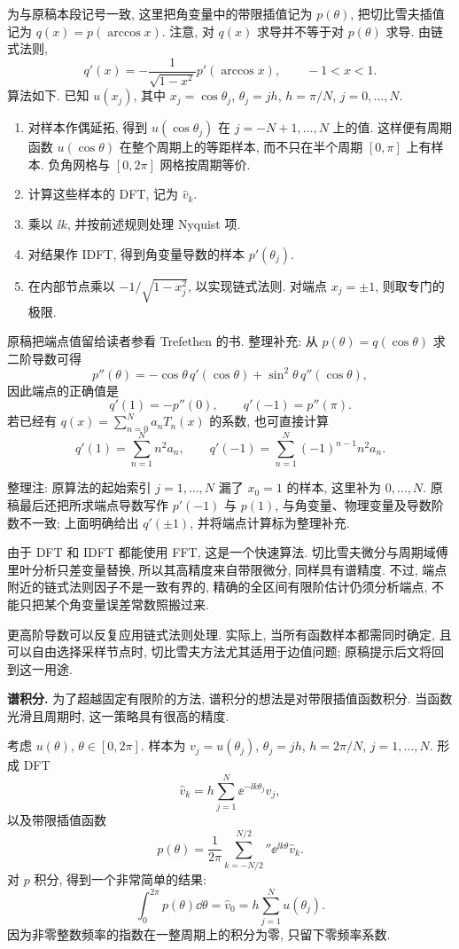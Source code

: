 为与原稿本段记号一致, 这里把角变量中的带限插值记为 $p(\theta)$, 把切比雪夫插值记为 $q(x)=p(\arccos x)$. 注意, 对 $q(x)$ 求导并不等于对 $p(\theta)$ 求导. 由链式法则,
\[
q'(x)=-\frac1{\sqrt{1-x^2}}p'(\arccos x),\qquad -1<x<1.
\]
算法如下. 已知 $u(x_j)$, 其中 $x_j=\cos\theta_j$, $\theta_j=jh$, $h=\pi/N$, $j=0,\ldots,N$.
\begin{enumerate}
\item 对样本作偶延拓, 得到 $u(\cos\theta_j)$ 在 $j=-N+1,\ldots,N$ 上的值. 这样便有周期函数 $u(\cos\theta)$ 在整个周期上的等距样本, 而不只在半个周期 $[0,\pi]$ 上有样本. 负角网格与 $[0,2\pi]$ 网格按周期等价.
\item 计算这些样本的 DFT, 记为 $\widehat v_k$.
\item 乘以 $\ii k$, 并按前述规则处理 Nyquist 项.
\item 对结果作 IDFT, 得到角变量导数的样本 $p'(\theta_j)$.
\item 在内部节点乘以 $-1/\sqrt{1-x_j^2}$, 以实现链式法则. 对端点 $x_j=\pm1$, 则取专门的极限.
\end{enumerate}
原稿把端点值留给读者参看 Trefethen 的书. 整理补充: 从 $p(\theta)=q(\cos\theta)$ 求二阶导数可得
\[
p''(\theta)=-\cos\theta\,q'(\cos\theta)
+\sin^2\theta\,q''(\cos\theta),
\]
因此端点的正确值是
\[
q'(1)=-p''(0),\qquad q'(-1)=p''(\pi).
\]
若已经有 $q(x)=\sum_{n=0}^{N}a_nT_n(x)$ 的系数, 也可直接计算
\[
q'(1)=\sum_{n=1}^{N}n^2a_n,\qquad
q'(-1)=\sum_{n=1}^{N}(-1)^{n-1}n^2a_n.
\]
\begin{remark}
整理注: 原算法的起始索引 $j=1,\ldots,N$ 漏了 $x_0=1$ 的样本, 这里补为 $0,\ldots,N$. 原稿最后还把所求端点导数写作 $p'(-1)$ 与 $p(1)$, 与角变量、物理变量及导数阶数不一致; 上面明确给出 $q'(\pm1)$, 并将端点计算标为整理补充.
\end{remark}

由于 DFT 和 IDFT 都能使用 FFT, 这是一个快速算法. 切比雪夫微分与周期域傅里叶分析只差变量替换, 所以其高精度来自带限微分, 同样具有谱精度. 不过, 端点附近的链式法则因子不是一致有界的, 精确的全区间有限阶估计仍须分析端点, 不能只把某个角变量误差常数照搬过来.

更高阶导数可以反复应用链式法则处理. 实际上, 当所有函数样本都需同时确定, 且可以自由选择采样节点时, 切比雪夫方法尤其适用于边值问题; 原稿提示后文将回到这一用途.

\label{sec:spectral-integration}
\textbf{谱积分.} 为了超越固定有限阶的方法, 谱积分的想法是对带限插值函数积分. 当函数光滑且周期时, 这一策略具有很高的精度.

考虑 $u(\theta)$, $\theta\in[0,2\pi]$. 样本为 $v_j=u(\theta_j)$, $\theta_j=jh$, $h=2\pi/N$, $j=1,\ldots,N$. 形成 DFT
\[
\widehat v_k=h\sum_{j=1}^{N}\ee^{-\ii k\theta_j}v_j,
\]
以及带限插值函数
\[
p(\theta)=\frac1{2\pi}\sum_{k=-N/2}^{N/2}{}''\ee^{\ii k\theta}\widehat v_k.
\]
对 $p$ 积分, 得到一个非常简单的结果:
\[
\int_0^{2\pi}p(\theta)\dd\theta
=\widehat v_0=h\sum_{j=1}^{N}u(\theta_j).
\]
因为非零整数频率的指数在一整周期上的积分为零, 只留下零频率系数.

